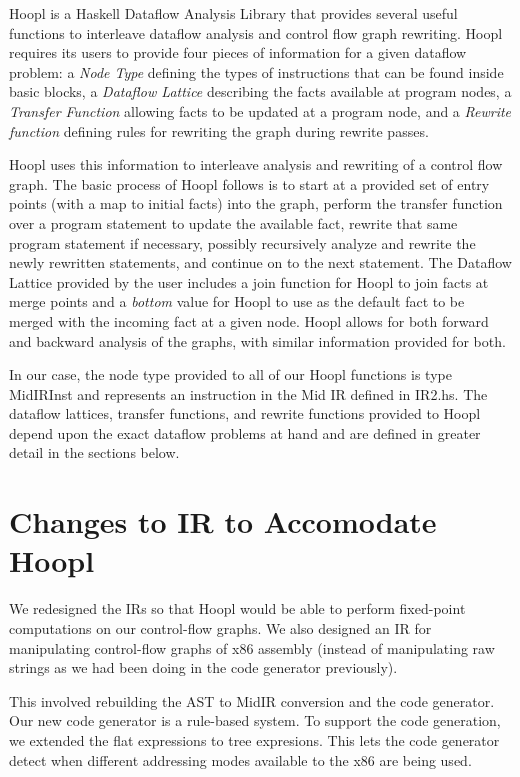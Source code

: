 \documentclass[11pt]{article}
\begin{document}
Hoopl is a Haskell Dataflow Analysis Library that provides several useful functions to interleave dataflow analysis and control flow graph rewriting. Hoopl requires its users to provide four pieces of information for a given dataflow problem: a \emph{Node Type} defining the types of instructions that can be found inside basic blocks, a \emph{Dataflow Lattice} describing the facts available at program nodes, a \emph{Transfer Function} allowing facts to be updated at a program node, and a \emph{Rewrite function} defining rules for rewriting the graph during rewrite passes. 

Hoopl uses this information to interleave analysis and rewriting of a control flow graph. The basic process of Hoopl follows is to start at a provided set of entry points (with a map to initial facts) into the graph, perform the transfer function over a program statement to update the available fact, rewrite that same program statement if necessary, possibly recursively analyze and rewrite the newly rewritten statements, and continue on to the next statement. The Dataflow Lattice provided by the user includes a join function for Hoopl to join facts at merge points and a \emph{bottom} value for Hoopl to use as the default fact to be merged with the incoming fact at a given node. Hoopl allows for both forward and backward analysis of the graphs, with similar information provided for both. 

In our case, the node type provided to all of our Hoopl functions is type MidIRInst and represents an instruction in the Mid IR defined in IR2.hs. The dataflow lattices, transfer functions, and rewrite functions provided to Hoopl depend upon the exact dataflow problems at hand and are defined in greater detail in the sections below. 



\section {Changes to IR to Accomodate Hoopl}
\label{sec:changes}

We redesigned the IRs so that Hoopl would be able to perform
fixed-point computations on our control-flow graphs.  We also designed
an IR for manipulating control-flow graphs of x86 assembly (instead of
manipulating raw strings as we had been doing in the code generator
previously).

This involved rebuilding the AST to MidIR conversion and the code
generator.  Our new code generator is a rule-based system.  To support
the code generation, we extended the flat expressions to tree
expresions.  This lets the code generator detect when different
addressing modes available to the x86 are being used.
\end{document}
